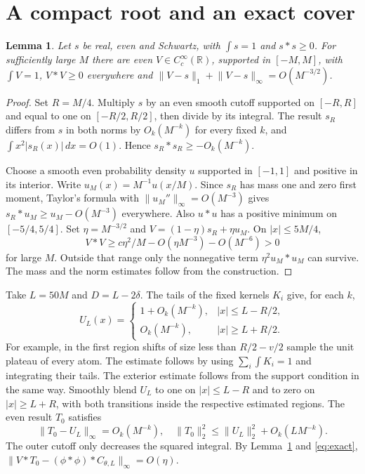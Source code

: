\documentclass[11pt]{article}
\newtheorem{lemma}[theorem]{Lemma}
\newcommand{\R}{\mathbb R}
\newcommand{\norm}[1]{\lVert #1\rVert}
\newcommand{\cc}{C_c^\infty(\R)}
\begin{document}
\section{A compact root and an exact cover}
\begin{lemma}\label{lem:repair}
Let \(s\) be real, even and Schwartz, with \(\int s=1\) and \(s*s\ge0\). For sufficiently large \(M\) there are even \(V\in\cc\), supported in \([-M,M]\), with \(\int V=1\), \(V*V\ge0\) everywhere and
\(\norm{V-s}_1+\norm{V-s}_\infty=O(M^{-3/2})\).
\end{lemma}
\begin{proof}
Set \(R=M/4\). Multiply \(s\) by an even smooth cutoff supported on \([-R,R]\) and equal to one on \([-R/2,R/2]\), then divide by its integral. The result \(s_R\) differs from \(s\) in both norms by \(O_k(M^{-k})\) for every fixed \(k\), and \(\int x^2|s_R(x)|\,dx=O(1)\). Hence \(s_R*s_R\ge-O_k(M^{-k})\).

Choose a smooth even probability density \(u\) supported in \([-1,1]\) and positive in its interior. Write \(u_M(x)=M^{-1}u(x/M)\). Since \(s_R\) has mass one and zero first moment, Taylor's formula with \(\norm{u_M''}_\infty=O(M^{-3})\) gives \(s_R*u_M\ge u_M-O(M^{-3})\) everywhere. Also \(u*u\) has a positive minimum on \([-5/4,5/4]\). Set \(\eta=M^{-3/2}\) and \(V=(1-\eta)s_R+\eta u_M\). On \(|x|\le5M/4\),
\[
 V*V\ge c\eta^2/M-O(\eta M^{-3})-O(M^{-6})>0
\]
for large \(M\). Outside that range only the nonnegative term \(\eta^2 u_M*u_M\) can survive. The mass and the norm estimates follow from the construction.
\end{proof}

Take \(L=50M\) and \(D=L-2\delta\). The tails of the fixed kernels \(K_i\) give, for each \(k\),
\[
 U_L(x)=
 \begin{cases}
  1+O_k(M^{-k}),& |x|\le L-R/2,\\
  O_k(M^{-k}),& |x|\ge L+R/2 .
 \end{cases}
\]
For example, in the first region shifts of size less than \(R/2-v/2\) sample the unit plateau of every atom. The estimate follows by using \(\sum_i\int K_i=1\) and integrating their tails. The exterior estimate follows from the support condition in the same way. Smoothly blend \(U_L\) to one on \(|x|\le L-R\) and to zero on \(|x|\ge L+R\), with both transitions inside the respective estimated regions. The even result \(T_0\) satisfies
\[
 \norm{T_0-U_L}_\infty=O_k(M^{-k}),\quad
 \norm{T_0}_2^2\le\norm{U_L}_2^2+O_k(LM^{-k}).
\]
The outer cutoff only decreases the squared integral. By Lemma~\ref{lem:repair} and \eqref{eq:exact}, \(\norm{V*T_0-(\phi*\phi)*C_{\theta,L}}_\infty=O(\eta)\).
\end{document}
